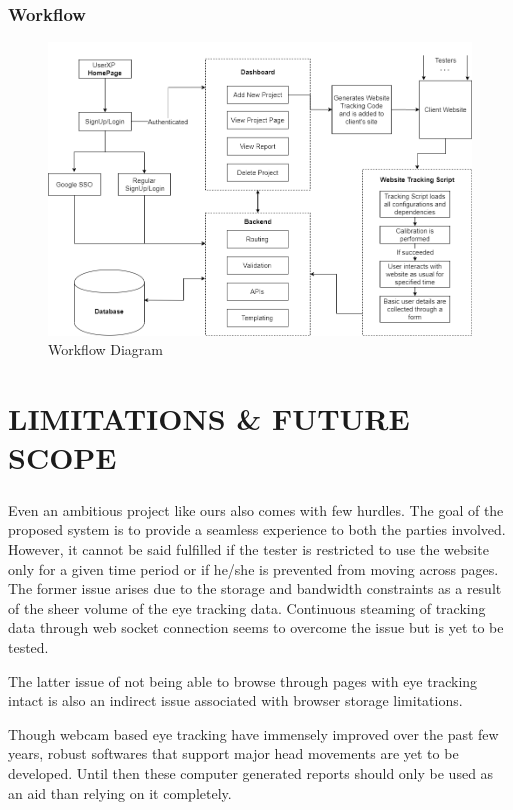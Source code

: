 \documentclass[hidelinks,12pt,a4paper,final]{extreport}
\begin{document}
\subsection{Workflow}
\begin{figure}[H]
    \centering
    \includegraphics[width=\linewidth]{userXP- Workflow.png}
    \caption{Workflow Diagram}
\end{figure}
\newpage
\chapter{LIMITATIONS \& FUTURE SCOPE}
\paragraph{}
Even an ambitious project like ours also comes with few hurdles. The goal of the proposed system is to provide a seamless experience to both the parties involved. However, it cannot be said fulfilled if the tester is restricted to use the website only for a given time period or if he/she is prevented from moving across pages. The former issue arises due to the storage and bandwidth constraints as a result of the sheer volume of the eye tracking data. Continuous steaming of tracking data through web socket connection seems to overcome the issue but is yet to be tested. 

The latter issue of not being able to browse through pages with eye tracking intact is also an indirect issue associated with browser storage limitations. 

Though webcam based eye tracking have immensely improved over the past few years, robust softwares that support major head movements are yet to be developed. Until then these computer generated reports should only be used as an aid than relying on it completely.
\end{document}
